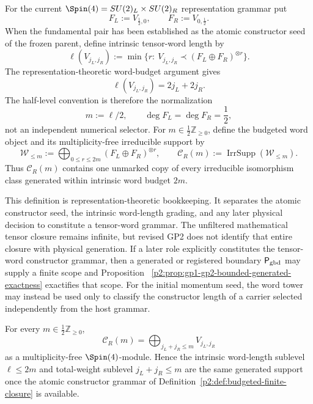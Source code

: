 \documentclass[12pt,a4paper]{article}
\begin{document}
\begin{definition}
\label{p2:def:budgeted-finite-closure}
For the current \(\Spin(4)=SU(2)_L\times SU(2)_R\) representation grammar put
\[
 F_L:=V_{\frac12,0},\qquad F_R:=V_{0,\frac12}.
\]
When the fundamental pair has been established as the atomic constructor seed
of the frozen parent, define intrinsic tensor-word length by
\[
 \ell(V_{j_L,j_R})
 :=\min\{r:\ V_{j_L,j_R}\prec(F_L\oplus F_R)^{\otimes r}\}.
\]
The representation-theoretic word-budget argument gives
\[
 \ell(V_{j_L,j_R})=2j_L+2j_R.
\]
The half-level convention is therefore the normalization
\[
 m:=\ell/2,
 \qquad \deg F_L=\deg F_R=\frac12,
\]
not an independent numerical selector.  For
\(m\in\frac12\mathbb Z_{\ge0}\), define the budgeted word object and its
multiplicity-free irreducible support by
\[
 \mathcal W_{\le m}
 :=\bigoplus_{0\le r\le 2m}(F_L\oplus F_R)^{\otimes r},
 \qquad
 \mathcal C_R(m):=\operatorname{IrrSupp}(\mathcal W_{\le m}).
\]
Thus \(\mathcal C_R(m)\) contains one unmarked copy of every irreducible
isomorphism class generated within intrinsic word budget \(2m\).

This definition is representation-theoretic bookkeeping.  It separates the
atomic constructor seed, the intrinsic word-length grading, and any later
physical decision to constitute a tensor-word grammar.  The unfiltered
mathematical tensor closure remains infinite, but revised GP2 does not identify
that entire closure with physical generation.  If a later role explicitly
constitutes the tensor-word constructor grammar, then a generated or registered
boundary \(\mathsf P_{\rm gbd}\) may supply a finite scope and Proposition~
\ref{p2:prop:gp1-gp2-bounded-generated-exactness} exactifies that scope.  For
the initial momentum seed, the word tower may instead be used only to classify
the constructor length of a carrier selected independently from the host
grammar.
\end{definition}

\begin{proposition}
\label{p2:prop:word-budget-lower-ideal}
For every \(m\in\frac12\mathbb Z_{\ge0}\),
\[
 \mathcal C_R(m)
 =\bigoplus_{j_L+j_R\le m}V_{j_L,j_R}
\]
as a multiplicity-free \(\Spin(4)\)-module.  Hence the intrinsic
word-length sublevel \(\ell\le2m\) and total-weight sublevel
\(j_L+j_R\le m\) are the same generated support once the atomic constructor
grammar of Definition~\ref{p2:def:budgeted-finite-closure} is available.
\end{proposition}
\end{document}
